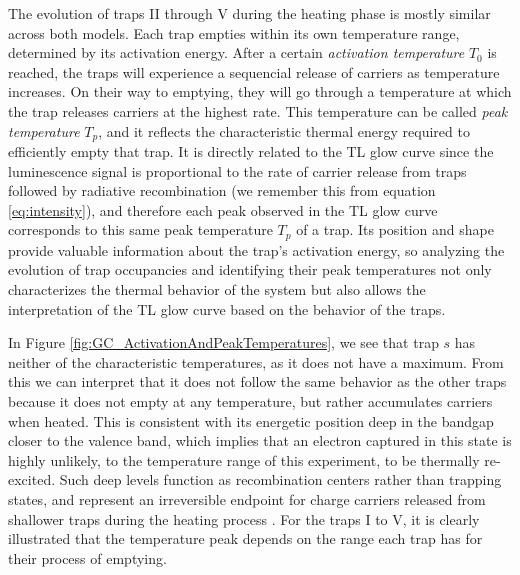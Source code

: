 \vspace{10pt}

The evolution of traps II through V during the heating phase is mostly similar across both models. Each trap empties within its own temperature range, determined by its activation energy. After a certain \textit{activation temperature} $T_0$ is reached, the traps will experience a sequencial release of carriers as temperature increases. On their way to emptying, they will go through a temperature at which the trap releases carriers at the highest rate. This temperature can be called \textit{peak temperature} $T_p$, and it reflects the characteristic thermal energy required to efficiently empty that trap. It is directly related to the TL glow curve since the luminescence signal is proportional to the rate of carrier release from traps followed by radiative recombination (we remember this from equation \ref{eq:intensity}), and therefore each peak observed in the TL glow curve corresponds to this same peak temperature $T_p$ of a trap. Its position and shape provide valuable information about the trap's activation energy, so analyzing the evolution of trap occupancies and identifying their peak temperatures not only characterizes the thermal behavior of the system but also allows the interpretation of the TL glow curve based on the behavior of the traps.

\vspace{10pt}

In Figure \ref{fig:GC_ActivationAndPeakTemperatures}, we see that trap $s$ has neither of the characteristic temperatures, as it does not have a maximum. From this we can interpret that it does not follow the same behavior as the other traps because it does not empty at any temperature, but rather accumulates carriers when heated. This is consistent with its energetic position deep in the bandgap closer to the valence band, which implies that an electron captured in this state is highly unlikely, to the temperature range of this experiment, to be thermally re-excited. Such deep levels function as recombination centers rather than trapping states, and represent an irreversible endpoint for charge carriers released from shallower traps during the heating process \cite{mckeever_course_2022}. For the traps I to V, it is clearly illustrated that the temperature peak depends on the range each trap has for their process of emptying.

\vspace{10pt}

